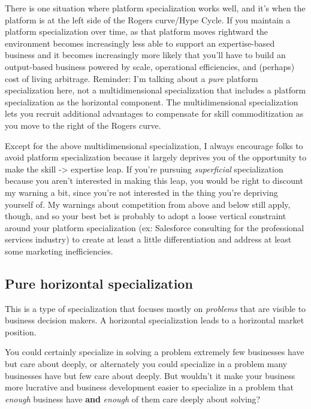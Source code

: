 There is one situation where platform specialization works well, and it's when the platform is at the left side of the Rogers curve/Hype Cycle. If you maintain a platform specialization over time, as that platform moves rightward the environment becomes increasingly less able to support an expertise-based business and it becomes increasingly more likely that you'll have to build an output-based business powered by scale, operational efficiencies, and (perhaps) cost of living arbitrage. Reminder: I'm talking about a \emph{pure} platform specialization here, not a multidimensional specialization that includes a platform specialization as the horizontal component. The multidimensional specialization lets you recruit additional advantages to compensate for skill commoditization as you move to the right of the Rogers curve.

Except for the above multidimensional specialization, I always encourage folks to avoid platform specialization because it largely deprives you of the opportunity to make the skill -\textgreater{} expertise leap. If you're pursuing \emph{superficial} specialization because you aren't interested in making this leap, you would be right to discount my warning a bit, since you're not interested in the thing you're depriving yourself of. My warnings about competition from above and below still apply, though, and so your best bet is probably to adopt a loose vertical constraint around your platform specialization (ex: Salesforce consulting for the professional services industry) to create at least a little differentiation and address at least some marketing inefficiencies.

\subsection{Pure horizontal specialization}

This is a type of specialization that focuses mostly on \emph{problems} that are visible to business decision makers. A horizontal specialization leads to a horizontal market position.

You could certainly specialize in solving a problem extremely few businesses have but care about deeply, or alternately you could specialize in a problem many businesses have but few care about deeply. But wouldn't it make your business more lucrative and business development easier to specialize in a problem that \emph{enough} business have \textbf{and} \emph{enough} of them care deeply about solving?

